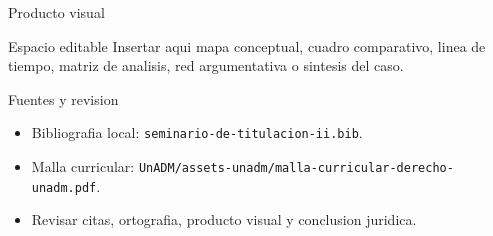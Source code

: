 \documentclass[
  spanish,
  aspectratio=169,
  xcolor={dvipsnames,table}
]{beamer}
\begin{document}
\begin{frame}{Producto visual}
  \begin{block}{Espacio editable}
    Insertar aqui mapa conceptual, cuadro comparativo, linea de tiempo,
    matriz de analisis, red argumentativa o sintesis del caso.
  \end{block}
  \centering
\end{frame}

\begin{frame}{Fuentes y revision}
  \begin{itemize}
    \item Bibliografia local: \texttt{seminario-de-titulacion-ii.bib}.
    \item Malla curricular: \texttt{UnADM/assets-unadm/malla-curricular-derecho-unadm.pdf}.
    \item Revisar citas, ortografia, producto visual y conclusion juridica.
  \end{itemize}
\end{frame}
\end{document}
